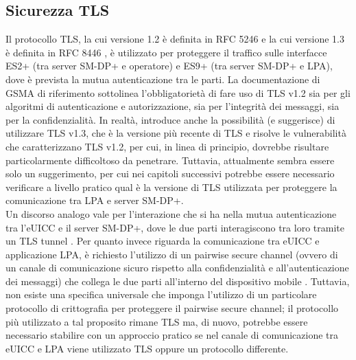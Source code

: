 \documentclass[10pt, twoside, openany]{book}
\begin{document}
\subsection{Sicurezza TLS}
Il protocollo TLS, la cui versione 1.2 è definita in RFC 5246 \cite{RFC-5246} e la cui versione 1.3 è definita in RFC 8446 \cite{RFC-8446}, è utilizzato per proteggere il traffico sulle interfacce ES2+ (tra server SM-DP+ e operatore) e ES9+ (tra server SM-DP+ e LPA), dove è prevista la mutua autenticazione tra le parti. La documentazione di GSMA di riferimento \cite{GSMA-docs-new} sottolinea l'obbligatorietà di fare uso di TLS v1.2 sia per gli algoritmi di autenticazione e autorizzazione, sia per l'integrità dei messaggi, sia per la confidenzialità. In realtà, introduce anche la possibilità (e suggerisce) di utilizzare TLS v1.3, che è la versione più recente di TLS e risolve le vulnerabilità che caratterizzano TLS v1.2, per cui, in linea di principio, dovrebbe risultare particolarmente difficoltoso da penetrare. Tuttavia, attualmente sembra essere solo un suggerimento, per cui nei capitoli successivi potrebbe essere necessario verificare a livello pratico qual è la versione di TLS utilizzata per proteggere la comunicazione tra LPA e server SM-DP+.\\
Un discorso analogo vale per l'interazione che si ha nella mutua autenticazione tra l'eUICC e il server SM-DP+, dove le due parti interagiscono tra loro tramite un TLS tunnel \cite{Sec-analysis}. Per quanto invece riguarda la comunicazione tra eUICC e applicazione LPA, è richiesto l'utilizzo di un pairwise secure channel (ovvero di un canale di comunicazione sicuro rispetto alla confidenzialità e all'autenticazione dei messaggi) che collega le due parti all'interno del dispositivo mobile \cite{Sec-analysis}. Tuttavia, non esiste una specifica universale che imponga l'utilizzo di un particolare protocollo di crittografia per proteggere il pairwise secure channel; il protocollo più utilizzato a tal proposito rimane TLS ma, di nuovo, potrebbe essere necessario stabilire con un approccio pratico se nel canale di comunicazione tra eUICC e LPA viene utilizzato TLS oppure un protocollo differente.
\end{document}
